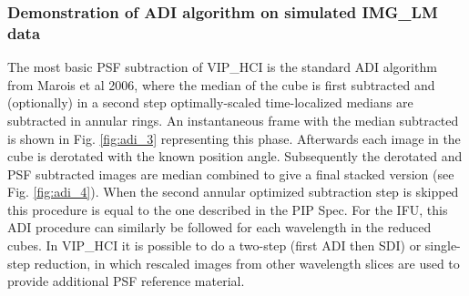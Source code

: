 \subsubsection{Demonstration of ADI algorithm on simulated IMG\_LM data}
The most basic PSF subtraction of VIP\_HCI is the standard ADI algorithm from Marois et al 2006, where the median of the cube is first subtracted and (optionally) in a second step optimally-scaled time-localized medians are subtracted in annular rings. An instantaneous frame with the median subtracted is shown in Fig. \ref{fig:adi_3} representing this phase. Afterwards each image in the cube is derotated with the known position angle. Subsequently the derotated and PSF subtracted images are median combined to give a final stacked version (see Fig. \ref{fig:adi_4}). When the second annular optimized subtraction step is skipped this procedure is equal to the one described in the PIP Spec.
For the IFU, this ADI procedure can similarly be followed for each wavelength in the reduced cubes. In VIP\_HCI it is possible to do a two-step (first ADI then SDI) or single-step reduction, in which rescaled images from other wavelength slices are used to provide additional PSF reference material.



